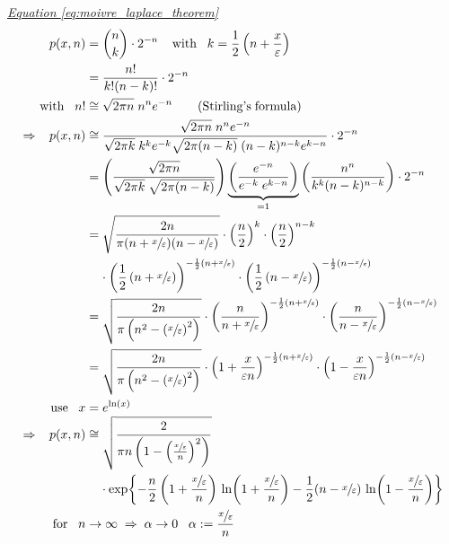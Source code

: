 \documentclass[a4paper, parskip=half]{scrartcl}
\newcommand{\myEqRef}[1]{\textit{\hyperref[eq:#1]{Equation \ref*{eq:#1}}}}
\begin{document}
\myEqRef{moivre_laplace_theorem}
\begin{align}
p(x,n) &= \binom{n}{k} \cdot 2^{-n}\;\;\;\; \mathrm{with}\;\;\; k = \frac{1}{2}\left(n+\frac{x}{\varepsilon}\right)\\
&= \frac{n!}{k!(n-k)!}\cdot 2^{-n}\\
\mathrm{with}\;\;\; n! &\cong \sqrt{2\pi n}\;n^ne^{-n}\tag{Stirling's\;formula}\\
\Rightarrow \;\;\; p(x,n) &\cong \frac{\sqrt{2\pi n}\;n^ne^{-n}}{\sqrt{2\pi k}\;k^ke^{-k} \sqrt{2\pi(n-k)}\;(n-k)^{n-k}e^{k-n}} \cdot 2^{-n}\\
&= \left(\frac{\sqrt{2\pi n}}{\sqrt{2\pi k}\;\sqrt{2\pi(n-k)}} \right) \underbrace{\left(\frac{e^{-n}}{e^{-k}\;e^{k-n}}\right)}_{=1} \left( \frac{n^n}{k^k(n-k)^{n-k}}\right)\cdot 2^{-n}\\
&= \sqrt{\frac{2n}{\pi(n+\sfrac{x}{\varepsilon})(n-\sfrac{x}{\varepsilon})}} \cdot \left(\frac{n}{2} \right)^k \cdot \left(\frac{n}{2} \right)^{n-k} \notag\\
&\;\;\;\;\cdot \left( \frac{1}{2}\left( n+\sfrac{x}{\varepsilon}\right) \right)^{-\frac{1}{2}(n+\sfrac{x}{\varepsilon})} \cdot \left( \frac{1}{2}\left( n-\sfrac{x}{\varepsilon}\right) \right)^{-\frac{1}{2}(n-\sfrac{x}{\varepsilon})} \\
&= \sqrt{\frac{2n}{\pi \left(n^2 - \left( \sfrac{x}{\varepsilon} \right)^2 \right)}} \cdot \left( \frac{n}{n+\sfrac{x}{\varepsilon}}\right)^{-\frac{1}{2}(n+\sfrac{x}{\varepsilon})} \cdot \left( \frac{n}{n-\sfrac{x}{\varepsilon}}\right)^{-\frac{1}{2}(n-\sfrac{x}{\varepsilon})} \\
&= \sqrt{\frac{2n}{\pi \left(n^2 - \left( \sfrac{x}{\varepsilon} \right)^2 \right)}} \cdot \left( 1 + \frac{x}{\varepsilon n}\right)^{-\frac{1}{2}(n+\sfrac{x}{\varepsilon})} \cdot \left( 1 - \frac{x}{\varepsilon n}\right)^{-\frac{1}{2}(n-\sfrac{x}{\varepsilon})} \\
\mathrm{use} \;\;\; x &= e^{\ln(x)}\\
\Rightarrow \;\;\; p(x,n) &\cong \sqrt{\frac{2}{\pi n\left(1 - \left( \frac{\sfrac{x}{\varepsilon}}{n} \right)^2 \right)}} \notag\\
&\;\;\;\;\cdot \exp\!\left\lbrace -\frac{n}{2}\left( 1+\frac{\sfrac{x}{\varepsilon}}{n} \right) \, \ln\!\left(1 + \frac{\sfrac{x}{\varepsilon}}{n} \right) -\frac{1}{2}(n-\sfrac{x}{\varepsilon})\, \ln\!\left(1 - \frac{\sfrac{x}{\varepsilon}}{n} \right) \right\rbrace \\
\mathrm{for}\;\;\; n &\rightarrow\infty \; \Rightarrow \; \alpha \rightarrow 0 \;\;\; \alpha := \frac{\sfrac{x}{\varepsilon}}{n}\; \\ 

\end{align}
\end{document}
